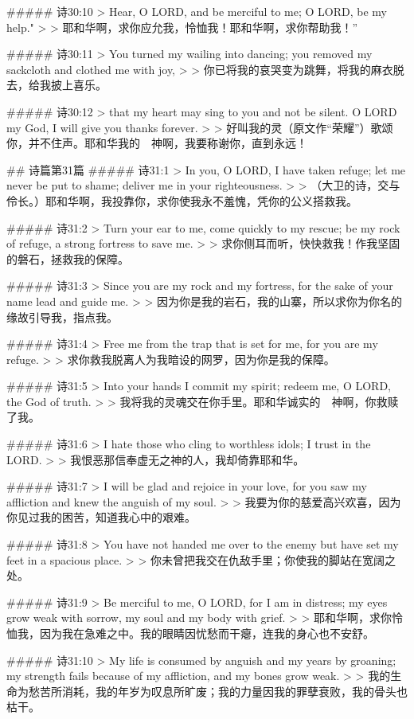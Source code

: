 ##### 诗30:10
> Hear, O LORD, and be merciful to me; O LORD, be my help."
>
> 耶和华啊，求你应允我，怜恤我！耶和华啊，求你帮助我！”


##### 诗30:11
> You turned my wailing into dancing; you removed my sackcloth and clothed me with joy,
>
> 你已将我的哀哭变为跳舞，将我的麻衣脱去，给我披上喜乐。


##### 诗30:12
> that my heart may sing to you and not be silent. O LORD my God, I will give you thanks forever.
>
> 好叫我的灵（原文作“荣耀”）歌颂你，并不住声。耶和华我的　神啊，我要称谢你，直到永远！


## 诗篇第31篇
##### 诗31:1
> In you, O LORD, I have taken refuge; let me never be put to shame; deliver me in your righteousness.
>
> （大卫的诗，交与伶长。）耶和华啊，我投靠你，求你使我永不羞愧，凭你的公义搭救我。


##### 诗31:2
> Turn your ear to me, come quickly to my rescue; be my rock of refuge, a strong fortress to save me.
>
> 求你侧耳而听，快快救我！作我坚固的磐石，拯救我的保障。


##### 诗31:3
> Since you are my rock and my fortress, for the sake of your name lead and guide me.
>
> 因为你是我的岩石，我的山寨，所以求你为你名的缘故引导我，指点我。


##### 诗31:4
> Free me from the trap that is set for me, for you are my refuge.
>
> 求你救我脱离人为我暗设的网罗，因为你是我的保障。


##### 诗31:5
> Into your hands I commit my spirit; redeem me, O LORD, the God of truth.
>
> 我将我的灵魂交在你手里。耶和华诚实的　神啊，你救赎了我。


##### 诗31:6
> I hate those who cling to worthless idols; I trust in the LORD.
>
> 我恨恶那信奉虚无之神的人，我却倚靠耶和华。


##### 诗31:7
> I will be glad and rejoice in your love, for you saw my affliction and knew the anguish of my soul.
>
> 我要为你的慈爱高兴欢喜，因为你见过我的困苦，知道我心中的艰难。


##### 诗31:8
> You have not handed me over to the enemy but have set my feet in a spacious place.
>
> 你未曾把我交在仇敌手里；你使我的脚站在宽阔之处。


##### 诗31:9
> Be merciful to me, O LORD, for I am in distress; my eyes grow weak with sorrow, my soul and my body with grief.
>
> 耶和华啊，求你怜恤我，因为我在急难之中。我的眼睛因忧愁而干瘪，连我的身心也不安舒。


##### 诗31:10
> My life is consumed by anguish and my years by groaning; my strength fails because of my affliction, and my bones grow weak.
>
> 我的生命为愁苦所消耗，我的年岁为叹息所旷废；我的力量因我的罪孽衰败，我的骨头也枯干。


